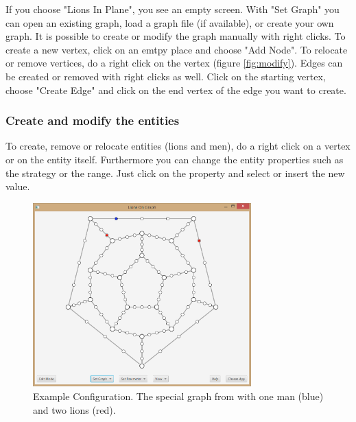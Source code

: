 \documentclass[a4paper]{article}
\begin{document}

If you choose "Lions In Plane", you see an empty screen. With "Set Graph" you can open an existing graph, load a graph file (if available), or create your own graph. It is possible to create or modify the graph manually with right clicks. To create a new vertex, click on an emtpy place and choose "Add Node". To relocate or remove vertices, do a right click on the vertex (figure \ref{fig:modify}). Edges can be created or removed with right clicks as well. Click on the starting vertex, choose "Create Edge" and click on the end vertex of the edge you want to create.

\subsubsection*{Create and modify the entities}
To create, remove or relocate entities (lions and men), do a right click on a vertex or on the entity itself. Furthermore you can change the entity properties such as the strategy or the range. Just click on the property and select or insert the new value.

\begin{figure}[hbt]
  \centering
    \includegraphics[width=0.75\textwidth]{graphApplet.PNG}
  \caption{Example Configuration. The special graph from \cite{paper} with one man (blue) and two lions (red).}
  \label{fig:graphApplet}
\end{figure}
\end{document}
